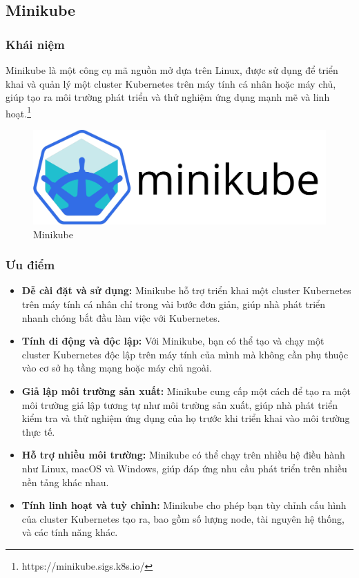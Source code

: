 \subsection{Minikube}
\subsubsection{Khái niệm}
\noindent Minikube là một công cụ mã nguồn mở dựa trên Linux, được sử dụng để triển khai và quản lý một cluster Kubernetes trên máy tính cá nhân hoặc máy chủ, giúp tạo ra môi trường phát triển và thử nghiệm ứng dụng mạnh mẽ và linh hoạt.\footnote{https://minikube.sigs.k8s.io/}
\begin{figure}[H]
  \begin{center}
    \includegraphics[scale=0.35]{images/hieu/phuluc/minikube.png}
    \caption{Minikube}
  \end{center}
\end{figure}
\subsubsection{Ưu điểm}
\begin{itemize}
  \item \textbf{Dễ cài đặt và sử dụng:} Minikube hỗ trợ triển khai một cluster Kubernetes trên máy tính cá nhân chỉ trong vài bước đơn giản, giúp nhà phát triển nhanh chóng bắt đầu làm việc với Kubernetes.
  \item \textbf{Tính di động và độc lập:} Với Minikube, bạn có thể tạo và chạy một cluster Kubernetes độc lập trên máy tính của mình mà không cần phụ thuộc vào cơ sở hạ tầng mạng hoặc máy chủ ngoài.
  \item \textbf{Giả lập môi trường sản xuất:} Minikube cung cấp một cách để tạo ra một môi trường giả lập tương tự như môi trường sản xuất, giúp nhà phát triển kiểm tra và thử nghiệm ứng dụng của họ trước khi triển khai vào môi trường thực tế.
  \item \textbf{Hỗ trợ nhiều môi trường:} Minikube có thể chạy trên nhiều hệ điều hành như Linux, macOS và Windows, giúp đáp ứng nhu cầu phát triển trên nhiều nền tảng khác nhau.
  \item \textbf{Tính linh hoạt và tuỳ chỉnh:} Minikube cho phép bạn tùy chỉnh cấu hình của cluster Kubernetes tạo ra, bao gồm số lượng node, tài nguyên hệ thống, và các tính năng khác.
\end{itemize} 
